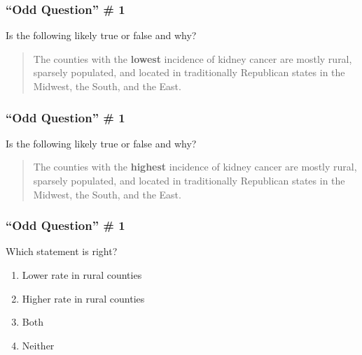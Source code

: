\documentclass{beamer}
\begin{document}
\begin{singlespace}
\begin{frame}
\frametitle{``Odd Question'' \# 1}
	Is the following likely true or false and why? 
	\begin{quote}
	    The counties with the \textbf{lowest} incidence of kidney cancer are mostly rural, sparsely 
	    populated, and located in traditionally Republican states in the Midwest, the South, and the 
	    East. 
	\end{quote}
\end{frame}

\begin{frame}
\frametitle{``Odd Question'' \# 1}
	Is the following likely true or false and why? 
	\begin{quote}
	    The counties with the \textbf{highest} incidence of kidney cancer are mostly rural, sparsely 
	    populated, and located in traditionally Republican states in the Midwest, the South, and the 
	    East. 
	\end{quote}
\end{frame}

\begin{frame}
\frametitle{``Odd Question'' \# 1}
    Which statement is right?    
    \begin{enumerate}[<+->]
        \item Lower rate in rural counties
        \item Higher rate in rural counties
        \item \alert<5>{Both}
        \item Neither
    \end{enumerate}
\end{frame}


\end{singlespace}
\end{document}
